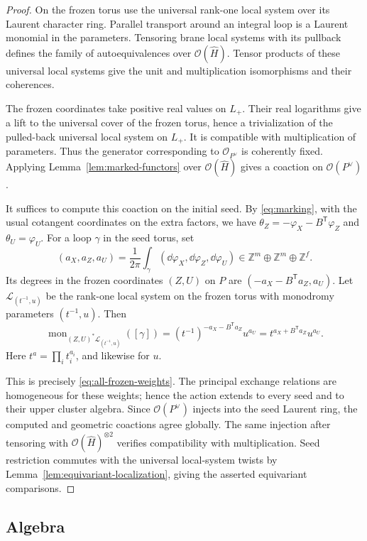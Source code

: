 \documentclass[12pt, letter]{amsart}
\theoremstyle{definition}
\newcommand{\Z}{\mathbb Z}
\numberwithin{equation}{section}
\begin{document}
\begin{proof}
On the frozen torus use the universal rank-one local system
over its Laurent character ring. Parallel transport around an
integral loop is a Laurent monomial in the parameters. Tensoring
brane local systems with its pullback defines the family of
autoequivalences over $\mathcal O(\widehat H)$. Tensor products
of these universal local systems give the unit and
multiplication isomorphisms and their coherences.

The frozen coordinates take positive real values on $L_+$.
Their real logarithms give a lift to the universal cover of the
frozen torus, hence a trivialization of the pulled-back universal
local system on $L_+$. It is compatible with multiplication of
parameters. Thus the generator corresponding to
$\mathcal O_{P^\vee}$ is coherently fixed. Applying
Lemma~\ref{lem:marked-functors} over $\mathcal O(\widehat H)$
gives a coaction on $\mathcal O(P^\vee)$.

It suffices to compute this coaction on the initial seed. By
\eqref{eq:marking}, with the usual cotangent coordinates on
the extra factors, we have 
$
 \theta_Z=-\varphi_X-B^{\mathsf T}\varphi_Z$ and $\theta_U=\varphi_U$.
For a loop $\gamma$ in the seed torus, set
\[
 (a_X,a_Z,a_U)=\frac1{2\pi}\int_\gamma
       (\dd\varphi_X,\dd\varphi_Z,\dd\varphi_U)
 \in\Z^m\oplus\Z^m\oplus\Z^f.
\]
Its degrees in the frozen coordinates $(Z,U)$ on $P$ are
$(-a_X-B^{\mathsf T}a_Z,a_U)$.
Let $\mathcal L_{(t^{-1},u)}$ be the rank-one local system on
the frozen torus with monodromy parameters $(t^{-1},u)$. Then
\[
 \operatorname{mon}_{(Z,U)^*\mathcal L_{(t^{-1},u)}}([\gamma])
 =(t^{-1})^{-a_X-B^{\mathsf T}a_Z}u^{a_U}
 =t^{a_X+B^{\mathsf T}a_Z}u^{a_U}.
\]
Here $t^a=\prod_i t_i^{a_i}$, and likewise for $u$.

This is precisely
\eqref{eq:all-frozen-weights}. The principal exchange relations
are homogeneous for these weights; hence the action extends
to every seed and to their upper cluster algebra. Since
$\mathcal O(P^\vee)$ injects into the seed Laurent ring, the
computed and geometric coactions agree globally. The same
injection after tensoring with
$\mathcal O(\widehat H)^{\otimes 2}$ verifies compatibility
with multiplication. Seed restriction commutes with the
universal local-system twists by
Lemma~\ref{lem:equivariant-localization}, giving the asserted
equivariant comparisons. 
\end{proof}


\subsection{Algebra}
\end{document}

